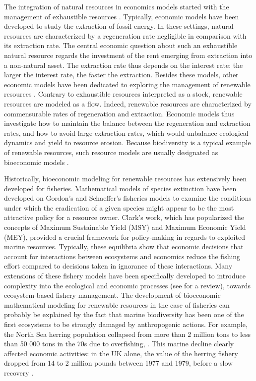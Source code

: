 The integration of natural resources in economics models started with the management of exhaustible resources \citep{Hotelling31, DasguptaHeal74}. Typically, economic models have been developed to study the extraction of fossil energy. In these settings, natural resources are characterized by a regeneration rate negligible in comparison with its extraction rate. The central economic question about such an exhaustible natural resource regards the investment of the rent emerging from extraction into a non-natural asset. The extraction rate thus depends on the interest rate: the larger the interest rate, the faster the extraction.
Besides these models, other economic models have been dedicated to exploring the management of renewable resources \citep{Smith68,Plourde70,Samuelson73}.
Contrary to exhaustible resources interpreted as a stock, renewable resources are modeled as a flow. Indeed, renewable resources are characterized by commensurable rates of regeneration and extraction. Economic models thus investigate how to maintain the balance between the regeneration and extraction rates, and how to avoid large extraction rates, which would unbalance ecological dynamics and yield to resource erosion.
Because biodiversity is a typical example of renewable resources, such resource models are usually designated as bioeconomic models \citep{Gordon1954,Scott55}.

Historically, bioeconomic modeling for renewable resources \citep{clark_profit_1973, Kontoleon2007} has extensively been developed for fisheries. Mathematical models of species extinction have been developed on Gordon's and Schaeffer's fisheries models \citep{Gordon1954, Schaefer1954}  to examine the conditions under which the eradication of a given species might appear to be the most attractive policy for a resource owner. Clark's work, which has popularized the concepts of Maximum Sustainable Yield (MSY) and Maximum Economic Yield (MEY), provided a crucial framework for policy-making in regards to exploited marine resources. Typically, these equilibria show that economic decisions that account for interactions between ecosystems and economics reduce the fishing effort compared to decisions taken in ignorance of these interactions. Many extensions of these fishery models have been specifically developed to introduce complexity into the ecological and economic processes (see \cite{Foley2012} for a review), towards ecosystem-based fishery management. 
The development of bioeconomic mathematical modeling for renewable resources in the case of fisheries can probably be explained by the fact that marine biodiversity has been one of the first ecosystems to be strongly damaged by anthropogenic actions. For example, the North Sea herring population collapsed from more than 2 million tons to less than 50 000 tons in the 70s due to overfishing, \citep{nash2005report}. This marine decline clearly affected economic activities: in the UK alone, the value of the herring fishery dropped from 14 to 2 million pounds between 1977 and 1979, before a slow recovery  \citep{wood1984report}.

